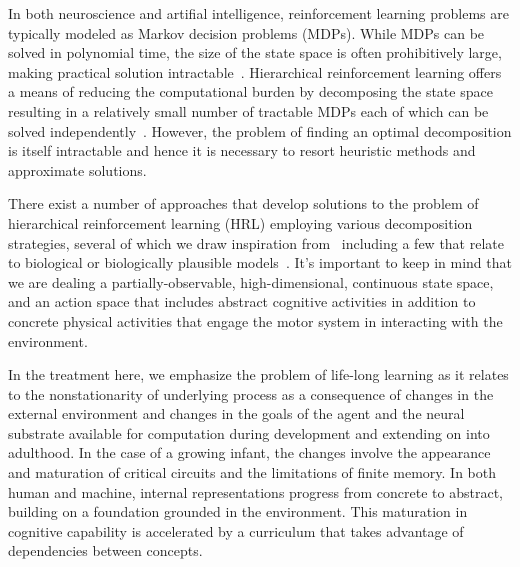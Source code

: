 \documentclass[letterpaper,11pt]{article}
\begin{document}
In both neuroscience and artifial intelligence, reinforcement learning problems are typically modeled as Markov decision problems (MDPs). While MDPs can be solved in polynomial time, the size of the state space is often prohibitively large, making practical solution intractable~\cite{LittmanetalUAI-95}. Hierarchical reinforcement learning offers a means of reducing the computational burden by decomposing the state space resulting in a relatively small number of tractable MDPs each of which can be solved independently~\cite{KaelblingICML-93,DietterichJAIR-00,HengstEMLDM-17}. However, the problem of finding an optimal decomposition is itself intractable and hence it is necessary to resort heuristic methods and approximate solutions.

There exist a number of approaches that develop solutions to the problem of hierarchical reinforcement learning (HRL) employing various decomposition strategies, several of which we draw inspiration from~\cite{NarasimhanetalJAIR-18,AndreasetalICML-17,SahnietalCoRR-17,KulkarnietalNIPS-16,BakkerandSchmidhuberIAS-04,MoffaertandNoweJMLR-14,PashevichetalCoRR-18} including a few that relate to biological or biologically plausible models~\cite{RasmussenetalPLoS-ONE-17,DiuketalCRMHOB-13,FrankandBadreCEREBRAL-CORTEX-12,RibasFernandesNEURON-11}. It's important to keep in mind that we are dealing a partially-observable, high-dimensional, continuous state space, and an action space that includes abstract cognitive activities in addition to concrete physical activities that engage the motor system in interacting with the environment. 

In the treatment here, we emphasize the problem of life-long learning as it relates to the nonstationarity of underlying process as a consequence of changes in the external environment and changes in the goals of the agent and the neural substrate available for computation during development and extending on into adulthood. In the case of a growing infant, the changes involve the appearance and maturation of critical circuits and the limitations of finite memory. In both human and machine, internal representations progress from concrete to abstract, building on a foundation grounded in the environment. This maturation in cognitive capability is accelerated by a curriculum that takes advantage of dependencies between concepts. 

\end{document}
